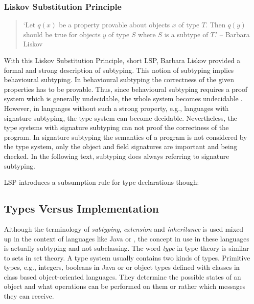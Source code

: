 \subsubsection{Liskov Substitution Principle}
\begin{quotation}
`Let $q(x)$ be a property provable about objects $x$ of type $T$. Then
$q(y)$ should be true for objects $y$ of type $S$ where $S$ is a subtype
of $T$.' -- Barbara Liskov \cite{liskov_behavioral_2001}
\end{quotation}

With this Liskov Substitution Principle, short LSP, Barbara Liskov
provided a formal and strong description of subtyping. This
notion of subtyping implies behavioural subtyping. In behavioural
subtyping the correctness of the given properties has to be
provable. Thus, since behavioural subtyping requires a proof system
which is generally undecidable, the whole system becomes undecidable
\cite{poll_behavioural_1998}. However, in languages without such a strong
property, e.g., languages with signature subtyping, the type system can
become decidable. Nevertheless, the type systems with signature subtyping
can not proof the correctness of the program. In signature subtyping
the semantics of a program is not considered by the type system, only
the object and field signatures are important and being checked. In the
following text, subtyping does always referring to signature subtyping.

LSP introduces a subsumption rule for type declarations though:

\begin{defn}[Subsumption]
\label{def:subsumption}
	\begin{mathpar}
	\end{mathpar}
\end{defn}

\subsection{Types Versus Implementation}
\label{sec:sharingTypes}
Although the terminology of \emph{subtyping}, \emph{extension} and
\emph{inheritance} is used mixed up in the context of languages like Java
or \cpp, the concept in use in these languages is actually subtyping and not subclassing.
The word \emph{type} in type theory is similar to sets in set theory. A
type system usually contains two kinds of types. Primitive types,
e.g., integers, booleans in Java or \cpp or object types defined with
classes in class based object-oriented languages. They determine the
possible states of an object and what operations can be performed on them
or rather which messages they can receive.


